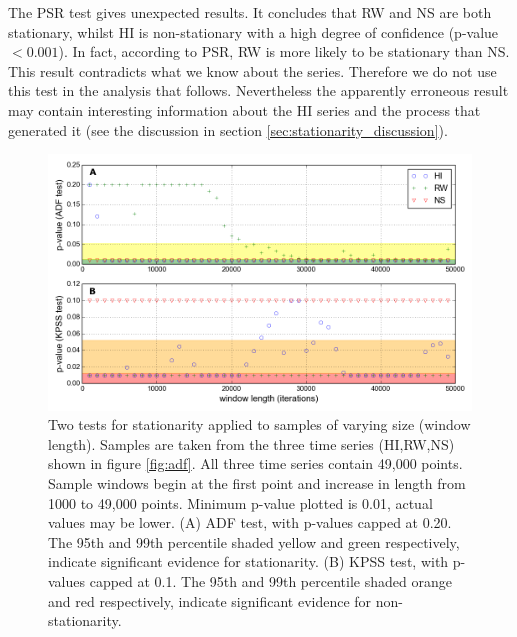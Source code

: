 The PSR test gives unexpected results. It concludes that RW and NS are both stationary, whilst HI is non-stationary with a high degree of confidence (p-value$<0.001$). In fact, according to PSR, RW is more likely to be stationary than NS. This result contradicts what we know about the series. Therefore we do not use this test in the analysis that follows. Nevertheless the apparently erroneous result may contain interesting information about the HI series and the process that generated it (see the discussion in section \ref{sec:stationarity_discussion}). 




\begin{figure}[h!]
	\centering
	\includegraphics[width=0.80\linewidth]{"./chapters/chapter04b/figures/Rtests/stat_tests_v_wl"}
     \caption{Two tests for stationarity applied to samples of varying size (window length). Samples are taken from the three time series (HI,RW,NS) shown in figure \ref{fig:adf}. All three time series contain 49,000 points. Sample windows begin at the first point and increase in length from 1000 to 49,000 points. Minimum p-value plotted is 0.01, actual values may be lower. (A) ADF test, with p-values capped at 0.20. The 95th and 99th percentile shaded yellow and green respectively, indicate significant evidence for stationarity. (B) KPSS test, with p-values capped at 0.1. The 95th and 99th percentile shaded orange and red respectively, indicate significant evidence for non-stationarity.} 
     \label{fig:stat_tests_v_wl}   
\end{figure}

